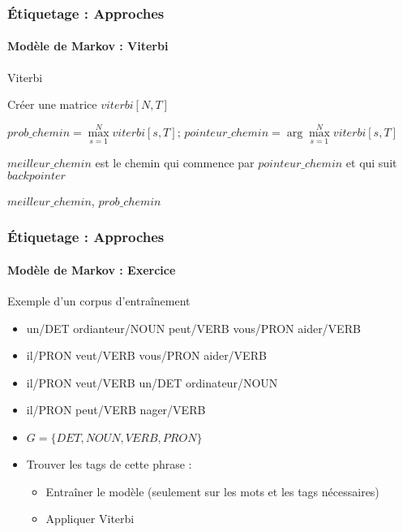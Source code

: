 \documentclass[xcolor=table]{beamer}
\begin{document}
\begin{frame}
\frametitle{Étiquetage : Approches}
\framesubtitle{Modèle de Markov : Viterbi}
\vspace{-6pt}
\begin{block}{Viterbi }
	\scriptsize
	\begin{algorithm}[H]
		
		Créer une matrice $viterbi[N, T]$\;
		
		
	
		$prob\_chemin = \max\limits_{s=1}^N viterbi[s, T];\, pointeur\_chemin = \arg\max\limits_{s=1}^N viterbi[s, T]$\;
		
		$meilleur\_chemin$ est le chemin qui commence par $pointeur\_chemin$ et qui suit $backpointer$
		
		\Return $meilleur\_chemin$, $prob\_chemin$\;
		
	\end{algorithm}
\end{block}

\end{frame}


\begin{frame}
\frametitle{Étiquetage : Approches}
\framesubtitle{Modèle de Markov : Exercice}

\begin{exampleblock}{Exemple d'un corpus d'entraînement}
	\begin{itemize}
		\item un/DET ordianteur/NOUN peut/VERB vous/PRON aider/VERB
		\item il/PRON veut/VERB vous/PRON aider/VERB
		\item il/PRON veut/VERB un/DET ordinateur/NOUN
		\item il/PRON peut/VERB nager/VERB
	\end{itemize}
\end{exampleblock}

\begin{itemize}
	\item $G = \{DET, NOUN, VERB, PRON\}$
	\item Trouver les tags de cette phrase : 
	\begin{itemize}
		\item Entraîner le modèle (seulement sur les mots et les tags nécessaires)
		\item Appliquer Viterbi
	\end{itemize}
\end{itemize}

\end{frame}
\end{document}
